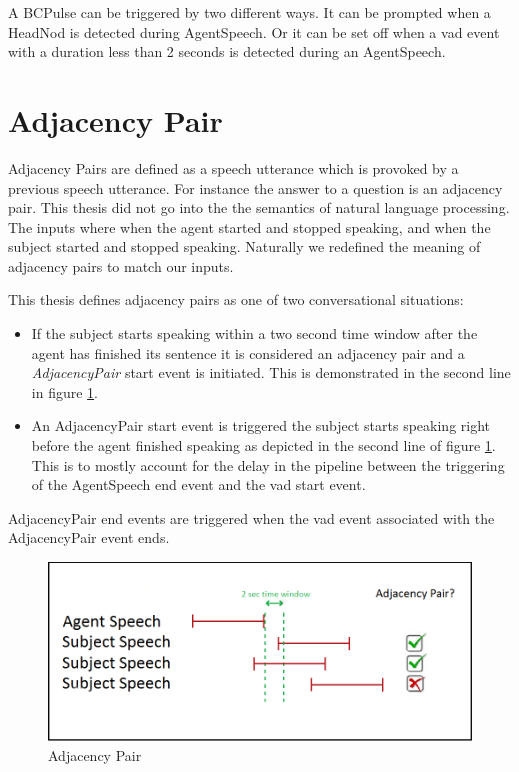 \documentclass[12pt, a4paper, fleqn]{memoir}%
\begin{document}
A BCPulse can be triggered by two different ways. It can be prompted when a HeadNod is detected during AgentSpeech. Or it can be set off when a vad event with a duration less than 2 seconds is detected during an AgentSpeech.

\section{Adjacency Pair}
\label{sec:AdjacencyPair}
Adjacency Pairs are defined as a speech utterance which is provoked by a previous speech utterance. For instance the answer to a question is an adjacency pair. This thesis did not go into the the semantics of natural language processing. The inputs where when the agent started and stopped speaking, and when the subject started and stopped speaking. Naturally we redefined the meaning of adjacency pairs to match our inputs.

This thesis defines adjacency pairs as one of two conversational situations:

\begin{itemize}
  \item If the subject starts speaking within a two second time window after the agent has finished its sentence it is considered an adjacency pair and a \textit{AdjacencyPair} start event is initiated. This is demonstrated in the second line in figure \ref{fig:AdjPair_img}.
  \item An AdjacencyPair start event is triggered the subject starts speaking right before the agent finished speaking as depicted in the second line of figure \ref{fig:AdjPair_img}. This is to mostly account for the delay in the pipeline between the triggering of the AgentSpeech end event and the vad start event.
\end{itemize}

AdjacencyPair end events are triggered when the vad event associated with the AdjacencyPair event ends.

\begin{figure}[h!]
    \centering
    \includegraphics[width=1\textwidth]{AP}
    \caption{Adjacency Pair}
    \label{fig:AdjPair_img}
\end{figure}
\end{document}
